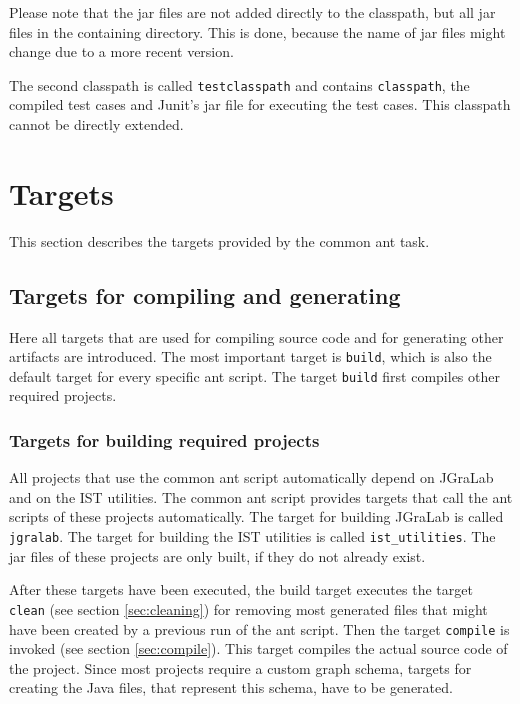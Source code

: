 \documentclass[a4paper,twoside,11pt,bibtotoc]{article}
\begin{document}
Please note that the jar files are not added directly to the classpath, but all jar files in the containing directory.
This is done, because the name of jar files might change due to a more recent version.

The second classpath is called \texttt{testclasspath} and contains \texttt{classpath}, the compiled test cases and Junit's jar file for executing the test cases.
This classpath cannot be directly extended.

\section{Targets}
\label{sec:targets}
This section describes the targets provided by the common ant task.

\subsection{Targets for compiling and generating}
\label{sec:creating}
Here all targets that are used for compiling source code and for generating other artifacts are introduced.
The most important target is \texttt{build}, which is also the default target for every specific ant script.
The target \texttt{build} first compiles other required projects.

\subsubsection{Targets for building required projects}
\label{sec:required}
All projects that use the common ant script automatically depend on JGraLab and on the IST utilities.
The common ant script provides targets that call the ant scripts of these projects automatically.
The target for building JGraLab is called \texttt{jgralab}.
The target for building the IST utilities is called \texttt{ist\_utilities}.
The jar files of these projects are only built, if they do not already exist.

After these targets have been executed, the build target executes the target \texttt{clean} (see section \ref{sec:cleaning}) for removing most generated files that might have been created by a previous run of the ant script.
Then the target \texttt{compile} is invoked (see section \ref{sec:compile}).
This target compiles the actual source code of the project.
Since most projects require a custom graph schema, targets for creating the Java files, that represent this schema, have to be generated.
\end{document}
